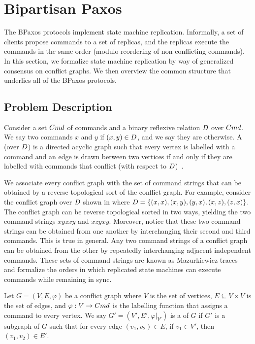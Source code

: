 \section{Bipartisan Paxos}
The BPaxos protocols implement state machine replication. Informally, a set of
clients propose commands to a set of replicas, and the replicas execute the
commands in the same order (modulo reordering of non-conflicting commands). In
this section, we formalize state machine replication by way of generalized
consensus on conflict graphs. We then overview the common structure that
underlies all of the BPaxos protocols.

\subsection{Problem Description}
{}

Consider a set $Cmd$ of commands and a binary reflexive relation $D$
over $Cmd$. We say two commands $x$ and $y$  if $(x, y) \in
D$, and we say they are  otherwise. A
 (over $D$) is a directed acyclic graph such
that every vertex is labelled with a command and an edge is drawn between two
vertices if and only if they are labelled with commands that conflict (with
respect to $D$)~\cite{mazurkiewicz1995introduction}.

We associate every conflict graph with the set of command strings that can be
obtained by a reverse topological sort of the conflict graph. For example,
consider the conflict graph over $D$ shown in
 where
  $D = \{(x, x), (x, y), (y, x), (x, z), (z, x)\}$.
The conflict graph can be reverse topological sorted in two ways, yielding the
two command strings $xyzxy$ and $xzyxy$. Moreover, notice that these two
command strings can be obtained from one another by interchanging their second
and third commands. This is true in general. Any two command strings of a
conflict graph can be obtained from the other by repeatedly interchanging
adjacent independent commands. These sets of command strings are known as
Mazurkiewicz traces~\cite{mazurkiewicz1985semantics,
mazurkiewicz1995introduction} and formalize the orders in which replicated
state machines can execute commands while remaining in sync.

Let $G = (V, E, \varphi)$ be a conflict graph where $V$ is the set of vertices,
$E \subseteq V \times V$ is the set of edges, and $\varphi: V \to Cmd$ is the
labelling function that assigns a command to every vertex. We say $G' = (V',
E', \varphi|_{V'})$ is a  of $G$ if $G'$ is a subgraph of $G$
such that for every edge $(v_1, v_2) \in E$, if $v_1 \in V'$, then $(v_1, v_2)
\in E'$.

